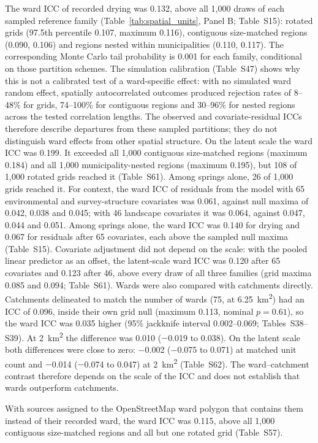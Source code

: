 \documentclass[preprint,12pt,authoryear]{elsarticle}
\begin{document}
The ward ICC of recorded drying was 0.132, above all 1,000 draws of each sampled reference family (Table~\ref{tab:spatial_units}, Panel B; Table~S15): rotated grids (97.5th percentile 0.107, maximum 0.116), contiguous size-matched regions (0.090, 0.106) and regions nested within municipalities (0.110, 0.117). The corresponding Monte Carlo tail probability is 0.001 for each family, conditional on those partition schemes. The simulation calibration (Table~S47) shows why this is not a calibrated test of a ward-specific effect: with no simulated ward random effect, spatially autocorrelated outcomes produced rejection rates of 8--48\% for grids, 74--100\% for contiguous regions and 30--96\% for nested regions across the tested correlation lengths. The observed and covariate-residual ICCs therefore describe departures from these sampled partitions; they do not distinguish ward effects from other spatial structure. On the latent scale the ward ICC was 0.199. It exceeded all 1,000 contiguous size-matched regions (maximum 0.184) and all 1,000 municipality-nested regions (maximum 0.195), but 108 of 1,000 rotated grids reached it (Table~S61). Among springs alone, 26 of 1,000 grids reached it. For context, the ward ICC of residuals from the model with 65 environmental and survey-structure covariates was 0.061, against null maxima of 0.042, 0.038 and 0.045; with 46 landscape covariates it was 0.064, against 0.047, 0.044 and 0.051. Among springs alone, the ward ICC was 0.140 for drying and 0.067 for residuals after 65 covariates, each above the sampled null maxima (Table~S15). Covariate adjustment did not depend on the scale: with the pooled linear predictor as an offset, the latent-scale ward ICC was 0.120 after 65 covariates and 0.123 after 46, above every draw of all three families (grid maxima 0.085 and 0.094; Table~S61). Wards were also compared with catchments directly. Catchments delineated to match the number of wards (75, at \SI{6.25}{\kilo\metre\squared}) had an ICC of 0.096, inside their own grid null (maximum 0.113, nominal $p = 0.61$), so the ward ICC was 0.035 higher (95\% jackknife interval 0.002--0.069; Tables~S38--S39). At \SI{2}{\kilo\metre\squared} the difference was 0.010 ($-$0.019 to 0.038). On the latent scale both differences were close to zero: $-$0.002 ($-$0.075 to 0.071) at matched unit count and $-$0.014 ($-$0.074 to 0.047) at \SI{2}{\kilo\metre\squared} (Table~S62). The ward--catchment contrast therefore depends on the scale of the ICC and does not establish that wards outperform catchments.

With sources assigned to the OpenStreetMap ward polygon that contains them instead of their recorded ward, the ward ICC was 0.115, above all 1,000 contiguous size-matched regions and all but one rotated grid (Table~S57).
\end{document}

